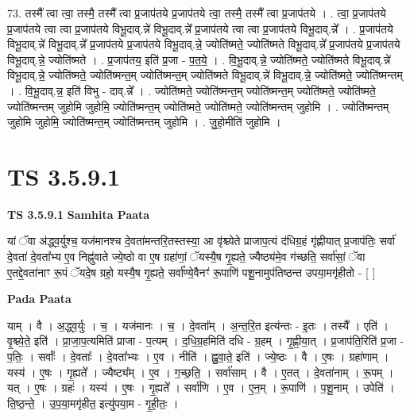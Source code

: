\documentclass[17pt]{extarticle}
\begin{document}
73. तस्मै᳚ त्वा त्वा॒ तस्मै॒ तस्मै᳚ त्वा प्र॒जाप॑तये प्र॒जाप॑तये त्वा॒ तस्मै॒ तस्मै᳚ त्वा प्र॒जाप॑तये । . त्वा॒ प्र॒जाप॑तये प्र॒जाप॑तये त्वा त्वा प्र॒जाप॑तये विभू॒दाव्.न्ने॑ विभू॒दाव्.न्ने᳚ प्र॒जाप॑तये त्वा त्वा प्र॒जाप॑तये विभू॒दाव्.न्ने᳚ । . प्र॒जाप॑तये विभू॒दाव्.न्ने॑ विभू॒दाव्.न्ने᳚ प्र॒जाप॑तये प्र॒जाप॑तये विभू॒दाव्.न्ने॒ ज्योति॑ष्मते॒ ज्योति॑ष्मते विभू॒दाव्.न्ने᳚ प्र॒जाप॑तये प्र॒जाप॑तये विभू॒दाव्.न्ने॒ ज्योति॑ष्मते । . प्र॒जाप॑तय॒ इति॑ प्र॒जा - प॒त॒ये॒ । . वि॒भू॒दाव्.न्ने॒ ज्योति॑ष्मते॒ ज्योति॑ष्मते विभू॒दाव्.न्ने॑ विभू॒दाव्.न्ने॒ ज्योति॑ष्मते॒ ज्योति॑ष्मन्त॒म् ज्योति॑ष्मन्त॒म् ज्योति॑ष्मते विभू॒दाव्.न्ने॑ विभू॒दाव्.न्ने॒ ज्योति॑ष्मते॒ ज्योति॑ष्मन्तम् । . वि॒भू॒दाव्.न्न॒ इति॑ विभु - दाव्.न्ने᳚ । . ज्योति॑ष्मते॒ ज्योति॑ष्मन्त॒म् ज्योति॑ष्मन्त॒म् ज्योति॑ष्मते॒ ज्योति॑ष्मते॒ ज्योति॑ष्मन्तम् जुहोमि जुहोमि॒ ज्योति॑ष्मन्त॒म् ज्योति॑ष्मते॒ ज्योति॑ष्मते॒ ज्योति॑ष्मन्तम् जुहोमि । . ज्योति॑ष्मन्तम् जुहोमि जुहोमि॒ ज्योति॑ष्मन्त॒म् ज्योति॑ष्मन्तम् जुहोमि । . जु॒हो॒मीति॑ जुहोमि । \newline
\pagebreak
{}

\section{ TS 3.5.9.1 }

\textbf{TS 3.5.9.1 } \newline
\textbf{Samhita Paata} \newline

यां ॅवा अ॑द्ध्व॒र्युश्च॒ यज॑मानश्च दे॒वता॑मन्तरि॒तस्तस्या॒ आ वृ॑श्च्येते प्राजाप॒त्यं द॑धिग्र॒हं गृ॑ह्णीयात् प्र॒जाप॑तिः॒ सर्वा॑ दे॒वता॑ दे॒वता᳚भ्य ए॒व निह्नु॑वाते ज्ये॒ष्ठो वा ए॒ष ग्रहा॑णां॒ ॅयस्यै॒ष गृ॒ह्यते॒ ज्यैष्ठ्य॑मे॒व ग॑च्छति॒ सर्वा॑सां॒ ॅवा ए॒तद्दे॒वता॑नाꣳ रू॒पं ॅयदे॒ष ग्रहो॒ यस्यै॒ष गृ॒ह्यते॒ सर्वा᳚ण्ये॒वैनꣳ॑ रू॒पाणि॑ पशू॒नामुप॑तिष्ठन्त उपया॒मगृ॑हीतो - [  ] \newline

\textbf{Pada Paata} \newline

याम् । वै । अ॒द्ध्व॒र्युः । च॒ । यज॑मानः । च॒ । दे॒वता᳚म् । अ॒न्त॒रि॒त इत्य॑न्तः - इ॒तः । तस्यै᳚ । एति॑ । वृ॒श्च्ये॒ते॒ इति॑ । प्रा॒जा॒प॒त्यमिति॑ प्राजा - प॒त्यम् । द॒धि॒ग्र॒हमिति॑ दधि - ग्र॒हम् । गृ॒ह्णी॒या॒त् । प्र॒जाप॑ति॒रिति॑ प्र॒जा - प॒तिः॒ । सर्वाः᳚ । दे॒वताः᳚ । दे॒वता᳚भ्यः । ए॒व । नीति॑ । ह्नु॒वा॒ते॒ इति॑ । ज्ये॒ष्ठः । वै । ए॒षः । ग्रहा॑णाम् । यस्य॑ । ए॒षः । गृ॒ह्यते᳚ । ज्यैष्ट्य᳚म् । ए॒व । ग॒च्छ॒ति॒ । सर्वा॑साम् । वै । ए॒तत् । दे॒वता॑नाम् । रू॒पम् । यत् । ए॒षः । ग्रहः॑ । यस्य॑ । ए॒षः । गृ॒ह्यते᳚ । सर्वा॑णि । ए॒व । ए॒न॒म् । रू॒पाणि॑ । प॒शू॒नाम् । उपेति॑ । ति॒ष्ठ॒न्ते॒ । उ॒प॒या॒मगृ॑हीत॒ इत्यु॑पया॒म - गृ॒ही॒तः॒ ।  \newline
\end{document}
